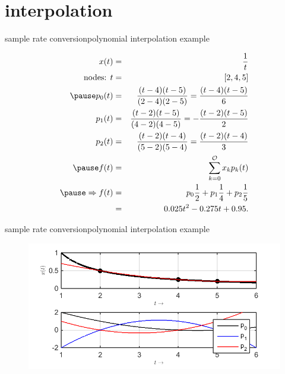        \section{interpolation}
	\begin{frame}{sample rate conversion}{polynomial interpolation example}
        \vspace{-5mm}
        \begin{footnotesize}
        \begin{eqnarray*}
            x(t) &=& \frac{1}{t}\\
            \text{nodes: } t &=& [2, 4, 5]\\
            \pause
            p_0(t) &=& \frac{(t-4)(t-5)}{(2-4)(2-5)} = \frac{(t-4)(t-5)}{6}\\
            p_1(t) &=& \frac{(t-2)(t-5)}{(4-2)(4-5)} = -\frac{(t-2)(t-5)}{2}\\
            p_2(t) &=& \frac{(t-2)(t-4)}{(5-2)(5-4)} = \frac{(t-2)(t-4)}{3}\\
            \pause
             f(t) &=& \sum\limits_{k=0}^\mathcal{O}x_k p_k(t)\\
            \pause
            \Rightarrow f(t) &=& p_0\frac{1}{2}+p_1\frac{1}{4}+p_2\frac{1}{5}\\
            &=& 0.025t^2 - 0.275t + 0.95 .
        \end{eqnarray*}
        \end{footnotesize}
    \end{frame}
	\begin{frame}{sample rate conversion}{polynomial interpolation example}
        \begin{figure}
            \begin{center}
                \includegraphics[scale=0.8]{graph/PolynomInterpol}
            \end{center}
        \end{figure}
    \end{frame}
